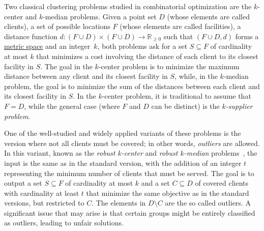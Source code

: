 \documentclass[12pt]{article}
\begin{document}
Two classical clustering problems studied in combinatorial optimization are the $k$-center and $k$-median problems. 
Given a point set $D$ (whose elements are called clients), a set of possible locations $F$ (whose elements are called facilities), a distance function $d : (F \cup D) \times (F \cup D) \rightarrow \mathbb{R}_{\geq 0}$ such that $(F\cup D, d)$ forms a \href{https://en.wikipedia.org/wiki/Metric_space}{metric space} and an integer~$k$, both problems ask for a set $S \subseteq F$ of cardinality at most $k$ that minimizes a cost involving the distance of each client to its closest facility in $S$.
The goal in the $k$-center problem is to minimize the maximum distance between any client and its closest facility in $S$, while, in the $k$-median problem, the goal is to minimize the sum of the distances between each client and its closest facility in $S$.
In the $k$-center problem, it is traditional to assume that $F=D$, while the general case (where $F$ and $D$ can be distinct) is the \emph{$k$-supplier problem}.

One of the well-studied and widely applied variants of these problems is the version where not all clients must be covered; in other words, \emph{outliers} are allowed. 
In this variant, known as the \emph{robust $k$-center} and \emph{robust $k$-median} problems~\cite{CharikarKMN2001}, the input is the same as in the standard version, with the addition of an integer $t$ representing the minimum number of clients that must be served. 
The goal is to output a set $S \subseteq F$ of cardinality at most $k$ and a set $C \subseteq D$ of covered clients with cardinality at least $t$ that minimize the same objective as in the standard versions, but restricted to $C$.  The elements in $D \setminus C$ are the so called outliers.  A significant issue that may arise is that certain groups might be entirely classified as outliers, leading to unfair solutions.
\end{document}
